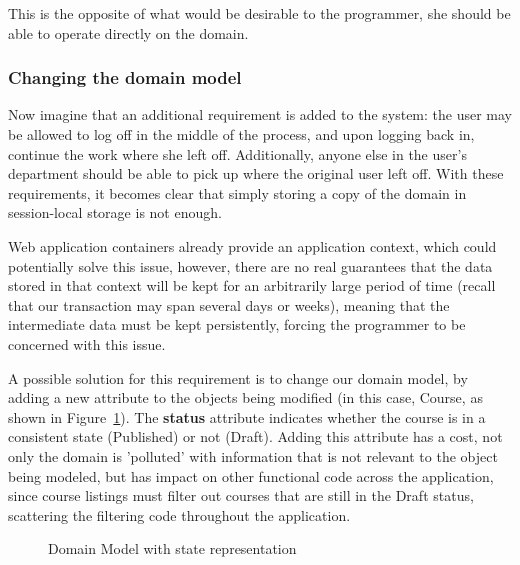 \documentclass{llncs}
\begin{document}
This is the opposite of what would be desirable to the programmer, she
should be able to operate directly on the domain.

\subsubsection{Changing the domain model}

Now imagine that an additional requirement is added to the system: the
user may be allowed to log off in the middle of the process, and upon
logging back in, continue the work where she left off. Additionally,
anyone else in the user's department should be able to pick up where
the original user left off. With these requirements, it becomes clear
that simply storing a copy of the domain in session-local storage is
not enough.

Web application containers already provide an application context,
which could potentially solve this issue, however, there are no real
guarantees that the data stored in that context will be kept for an
arbitrarily large period of time (recall that our transaction may span
several days or weeks), meaning that the intermediate data must be
kept persistently, forcing the programmer to be concerned with this
issue.

A possible solution for this requirement is to change our domain
model, by adding a new attribute to the objects being modified (in
this case, Course, as shown in
Figure~\ref{fig:courseDomainState}). The {\bf status} attribute
indicates whether the course is in a consistent state (Published) or
not (Draft). Adding this attribute has a cost, not only the domain is
'polluted' with information that is not relevant to the object being
modeled, but has impact on other functional code across the
application, since course listings must filter out courses that are
still in the Draft status, scattering the filtering code throughout
the application.

\begin{figure}
  \centering

\caption{Domain Model with state representation}
\label{fig:courseDomainState}

\end{figure}
\end{document}
